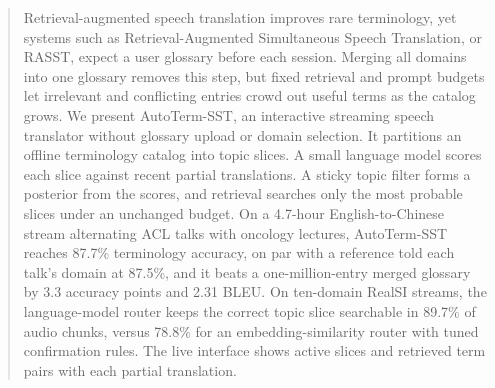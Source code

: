 \begin{abstract}
Retrieval-augmented speech translation improves rare terminology, yet systems
such as Retrieval-Augmented Simultaneous Speech Translation, or RASST, expect
a user glossary before each session. Merging all domains into one glossary
removes this step, but fixed retrieval and prompt budgets let irrelevant and conflicting
entries crowd out useful terms as the catalog grows. We present AutoTerm-SST,
an interactive streaming speech translator without glossary upload or domain
selection. It partitions an offline terminology catalog into topic slices.
A small language model scores each slice against recent partial translations.
A sticky topic filter forms a posterior from the scores, and retrieval
searches only the most probable slices under an unchanged budget. On a
4.7-hour English-to-Chinese stream alternating ACL talks with oncology
lectures, AutoTerm-SST reaches 87.7\% terminology accuracy, on par with a
reference told each talk's domain at 87.5\%, and it beats a
one-million-entry merged glossary by 3.3 accuracy points and 2.31 BLEU. On ten-domain
RealSI streams, the language-model router keeps the correct topic slice searchable in
89.7\% of audio chunks, versus 78.8\% for an embedding-similarity router with tuned
confirmation rules. The live interface shows active slices and retrieved term pairs with
each partial translation.
\end{abstract}
